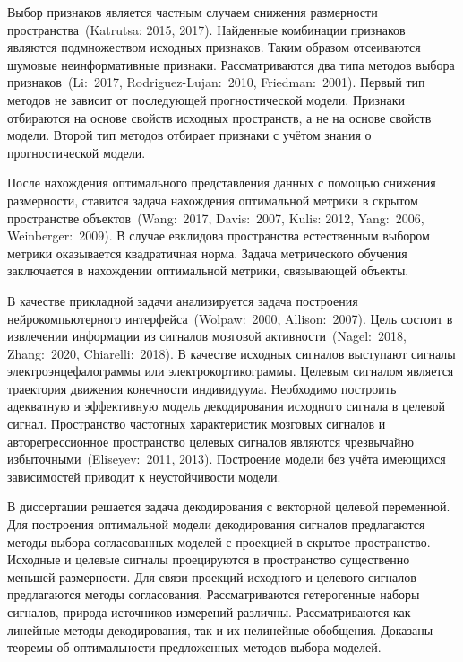 \documentclass[11pt, a5paper]{dissert}
\begin{document}
Выбор признаков является частным случаем снижения размерности пространства~(Katrutsa: 2015, 2017). 
Найденные комбинации признаков являются подмножеством исходных признаков.
Таким образом отсеиваются шумовые неинформативные признаки.
Рассматриваются два типа методов выбора признаков~(Li:~2017, Rodriguez-Lujan:~2010, Friedman:~2001).
Первый тип методов не зависит от последующей прогностической модели.
Признаки отбираются на основе свойств исходных пространств, а не на основе свойств модели.
Второй тип методов отбирает признаки с учётом знания о прогностической модели. 

После нахождения оптимального представления данных с помощью снижения размерности, ставится задача нахождения оптимальной метрики в скрытом пространстве объектов~(Wang:~2017, Davis:~2007, Kulis: 2012, Yang:~2006, Weinberger:~2009).
В случае евклидова пространства естественным выбором метрики оказывается квадратичная норма.
Задача метрического обучения заключается в нахождении оптимальной метрики, связывающей объекты.

В качестве прикладной задачи анализируется задача построения нейрокомпьютерного интерфейса~(Wolpaw:~2000, Allison:~2007). 
Цель состоит в извлечении информации из сигналов мозговой активности~(Nagel:~2018, Zhang:~2020, Chiarelli:~2018). 
В качестве исходных сигналов выступают сигналы электроэнцефалограммы или электрокортикограммы. 
Целевым сигналом является траектория движения конечности индивидуума.
Необходимо построить адекватную и эффективную модель декодирования исходного сигнала в целевой сигнал.
Пространство частотных характеристик мозговых сигналов и авторегрессионное пространство целевых сигналов являются чрезвычайно избыточными~(Eliseyev:~2011, 2013). 
Построение модели без учёта имеющихся зависимостей приводит к неустойчивости модели.

В диссертации решается задача декодирования с векторной целевой переменной. 
Для построения оптимальной модели декодирования сигналов предлагаются методы выбора согласованных моделей с проекцией в скрытое пространство.
Исходные и целевые сигналы проецируются в пространство существенно меньшей размерности. 
Для связи проекций исходного и целевого сигналов предлагаются методы согласования.
Рассматриваются гетерогенные наборы сигналов, природа источников измерений различны.
Рассматриваются как линейные методы декодирования, так и их нелинейные обобщения.
Доказаны теоремы об оптимальности предложенных методов выбора моделей.
\end{document}
